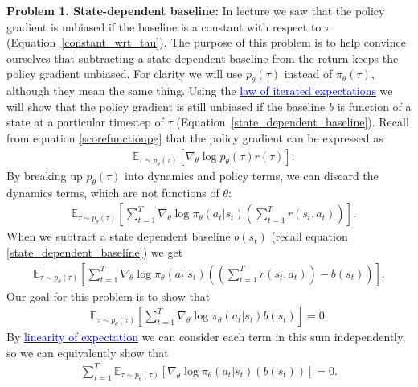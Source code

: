 \documentclass[12pt]{article}
\begin{document}
\textbf{Problem 1. State-dependent baseline:}
In lecture we saw that the policy gradient is unbiased if the baseline is a constant with respect to $\tau$ (Equation~\ref{constant_wrt_tau}). The purpose of this problem is to help convince ourselves that subtracting a state-dependent baseline from the return keeps the policy gradient unbiased. For clarity we will use $p_\theta(\tau)$ instead of $\pi_\theta(\tau)$, although they mean the same thing. Using the \href{https://en.wikipedia.org/wiki/Law_of_total_expectation}{\textcolor{blue}{law of iterated expectations}} we will show that the policy gradient is still unbiased if the baseline $b$ is function of a state at a particular timestep of $\tau$ (Equation~\ref{state_dependent_baseline}). Recall from equation \ref{scorefunctionpg} that the policy gradient can be expressed as
\begin{align*}
&\mathbb{E}_{\tau \sim p_\theta(\tau)} \left[\nabla_\theta \log p_\theta(\tau)r(\tau)\right].
\end{align*}
By breaking up $p_\theta(\tau)$ into dynamics and policy terms, we can discard the dynamics terms, which are not functions of $\theta$:
\begin{align*}
&\mathbb{E}_{\tau \sim p_\theta(\tau)} \left[\sum_{t=1}^T \nabla_\theta \log \pi_\theta(a_t|s_t) \left(\sum_{t=1}^T r(s_t, a_t)\right)\right].
\end{align*}
When we subtract a state dependent baseline $b(s_t)$ (recall equation \ref{state_dependent_baseline}) we get
\begin{align*}
\mathbb{E}_{\tau \sim p_\theta(\tau)} \left[\sum_{t=1}^T \nabla_\theta \log \pi_\theta(a_t|s_t) \left(\left(\sum_{t=1}^T r(s_t, a_t)\right) - b(s_t)\right)\right].
\end{align*}
Our goal for this problem is to show that 
\begin{align*}
\mathbb{E}_{\tau \sim p_\theta(\tau)} \left[\sum_{t=1}^T \nabla_\theta \log \pi_\theta(a_t|s_t) b(s_t)\right] = 0.
\end{align*}
By \href{https://brilliant.org/wiki/linearity-of-expectation/}{\textcolor{blue}{linearity of expectation}} we can consider each term in this sum independently, so we can equivalently show that
\begin{align} \label{independent}
\sum_{t=1}^T \mathbb{E}_{\tau \sim p_\theta(\tau)}\left[ \nabla_\theta \log \pi_\theta(a_t|s_t) \left(b(s_t)\right)\right] = 0.
\end{align}
\end{document}
